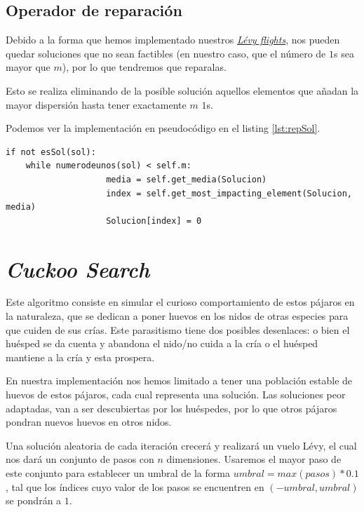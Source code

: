 \subsection{Operador de reparación}

Debido a la forma que hemos implementado nuestros \href{https://en.wikipedia.org/wiki/Lévy_flight}{\textit{Lévy flights}}, nos pueden quedar soluciones que no sean factibles (en nuestro caso, que el número de $1$s sea mayor que $m$), por lo que tendremos que reparalas.

Esto se realiza eliminando de la posible solución aquellos elementos que añadan la mayor dispersión hasta tener exactamente $m$ $1$s.

Podemos ver la implementación en pseudocódigo en el listing \ref{lst:repSol}.

\begin{lstlisting}[frame=single, caption={Reparador de soluciones}, captionpos=b, label=lst:repSol]
if not esSol(sol):
	while numerodeunos(sol) < self.m:
                    media = self.get_media(Solucion)
                    index = self.get_most_impacting_element(Solucion, media)
                    Solucion[index] = 0
\end{lstlisting}

\newpage

\section{\textit{Cuckoo Search}}

Este algoritmo consiste en simular el curioso comportamiento de estos pájaros en la naturaleza, que se dedican a poner huevos en los nidos de otras especies para que cuiden de sus crías. Este parasitismo tiene dos posibles desenlaces: o bien el huésped se da cuenta y abandona el nido/no cuida a la cría o el huésped mantiene a la cría y esta prospera.

En nuestra implementación nos hemos limitado a tener una población estable de huevos de estos pájaros, cada cual representa una solución. Las soluciones peor adaptadas, van a ser descubiertas por los huéspedes, por lo que otros pájaros pondran nuevos huevos en otros nidos.

Una solución aleatoria de cada iteración crecerá y realizará un vuelo Lévy, el cual nos dará un conjunto de pasos con $n$ dimensiones. Usaremos el mayor paso de este conjunto para establecer un umbral de la forma $umbral = max(pasos)*0.1$, tal que los índices cuyo valor de los pasos se encuentren en $(-umbral, umbral)$ se pondrán a $1$.

